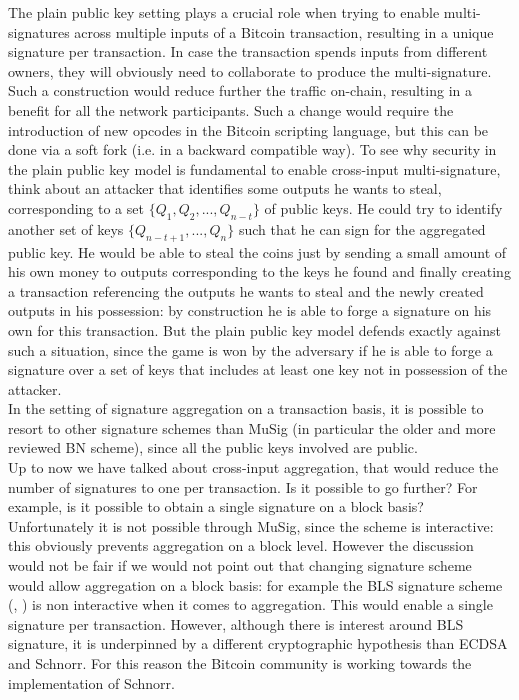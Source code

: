 \bigskip
\noindent
The plain public key setting plays a crucial role when trying to enable multi-signatures across multiple inputs of a Bitcoin transaction, resulting in a unique signature per transaction.  In case the transaction spends inputs from different owners, they will obviously need to collaborate to produce the multi-signature. Such a construction would reduce further the traffic on-chain, resulting in a benefit for all the network participants. Such a change would require the introduction of new opcodes in the Bitcoin scripting language, but this can be done via a soft fork (i.e. in a backward compatible way). To see why security in the plain public key model is fundamental to enable cross-input multi-signature, think about an attacker that identifies some outputs he wants to steal, corresponding to a set $\{Q_1, Q_2, ..., Q_{n - t}\}$ of public keys. He could try to identify another set of keys $\{Q_{n - t + 1}, ..., Q_n\}$ such that he can sign for the aggregated public key. He would be able to steal the coins just by sending a small amount of his own money to outputs corresponding to the keys he found and finally creating a transaction referencing the outputs he wants to steal and the newly created outputs in his possession: by construction he is able to forge a signature on his own for this transaction. But the plain public key model defends exactly against such a situation, since the game is won by the adversary if he is able to forge a signature over a set of keys that includes at least one key not in possession of the attacker. 
\\
In the setting of signature aggregation on a transaction basis, it is possible to resort to other signature schemes than MuSig (in particular the older and more reviewed BN scheme), since all the public keys involved are public.
\\
Up to now we have talked about cross-input aggregation, that would reduce the number of signatures to one per transaction. Is it possible to go further? For example, is it possible to obtain a single signature on a block basis? Unfortunately it is not possible through MuSig, since the scheme is interactive: this obviously prevents aggregation on a block level. However the discussion would not be fair if we would not point out that changing signature scheme would allow aggregation on a block basis: for example the BLS signature scheme (\cite{RefWork:15}, \cite{RefWork:16}) is non interactive when it comes to aggregation. This would enable a single signature per transaction. However, although there is interest around BLS signature, it is underpinned by a different cryptographic hypothesis than ECDSA and Schnorr. For this reason the Bitcoin community is working towards the implementation of Schnorr.


